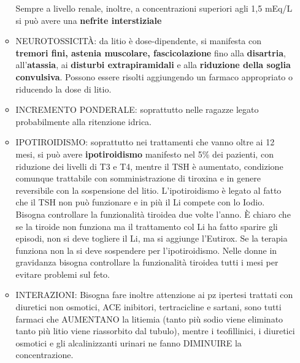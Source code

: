 \begin{itemize}
\begin{itemize}
  Sempre a livello renale, inoltre, a concentrazioni superiori agli 1,5
  mEq/L si può avere una \textbf{nefrite interstiziale}
\item
  NEUROTOSSICITÀ: da litio è dose-dipendente, si manifesta con
  \textbf{tremori fini, astenia muscolare, fascicolazione} fino alla
  \textbf{disartria}, all'\textbf{atassia}, ai \textbf{disturbi
  extrapiramidali} e alla \textbf{riduzione della soglia}
  \textbf{convulsiva}. Possono essere risolti aggiungendo un farmaco
  appropriato o riducendo la dose di litio.
\item
  INCREMENTO PONDERALE: soprattutto nelle ragazze legato probabilmente
  alla ritenzione idrica.
\item
  IPOTIROIDISMO: soprattutto nei trattamenti che vanno oltre ai 12 mesi,
  si può avere \textbf{ipotiroidismo} manifesto nel 5\% dei pazienti,
  con riduzione dei livelli di T3 e T4, mentre il TSH è aumentato,
  condizione comunque trattabile con somministrazione di tiroxina e in
  genere reversibile con la sospensione del litio. L'ipotiroidismo è
  legato al fatto che il TSH non può funzionare e in più il Li compete
  con lo Iodio. Bisogna controllare la funzionalità tiroidea due volte
  l'anno. È chiaro che se la tiroide non funziona ma il trattamento col
  Li ha fatto sparire gli episodi, non si deve togliere il Li, ma si
  aggiunge l'Eutirox. Se la terapia funziona non la si deve sospendere
  per l'ipotiroidismo. Nelle donne in gravidanza bisogna controllare la
  funzionalità tiroidea tutti i mesi per evitare problemi sul feto.
\item
  INTERAZIONI: Bisogna fare inoltre attenzione ai pz ipertesi trattati
  con diuretici non osmotici, ACE inibitori, tertracicline e sartani,
  sono tutti farmaci che AUMENTANO la litiemia (tanto più sodio viene
  eliminato tanto più litio viene riassorbito dal tubulo), mentre i
  teofillinici, i diuretici osmotici e gli alcalinizzanti urinari ne
  fanno DIMINUIRE la concentrazione.


\end{itemize}
\end{itemize}

